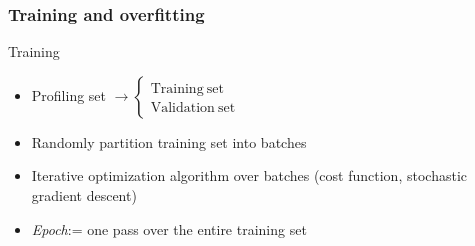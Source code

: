 \begin{frame}

\frametitle{Training and overfitting}
%
%
\vspace{-12pt}
\begin{block}{Training}
\begin{itemize}
\item[]  Profiling set 
$\rightarrow
\begin{cases} \mathrm{Training\ set}\\
 \mathrm{Validation\ set}
 \end{cases}$
\item[] Randomly partition training set into batches
\item[] Iterative optimization algorithm over batches (cost function, stochastic gradient descent)
\item[] \emph{Epoch}:= one pass over the entire training set

\end{itemize}


\end{block}
\end{frame}
